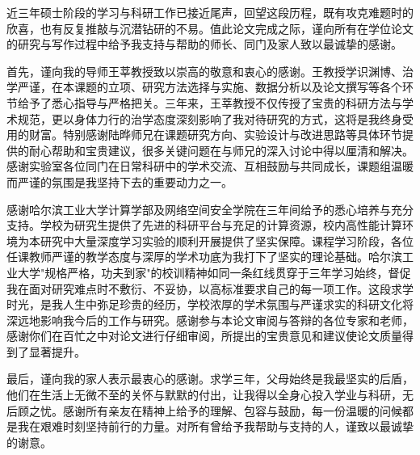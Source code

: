 \begin{acknowledgements}
近三年硕士阶段的学习与科研工作已接近尾声，回望这段历程，既有攻克难题时的欣喜，也有反复推敲与沉潜钻研的不易。值此论文完成之际，谨向所有在学位论文的研究与写作过程中给予我支持与帮助的师长、同门及家人致以最诚挚的感谢。

首先，谨向我的导师王莘教授致以崇高的敬意和衷心的感谢。王教授学识渊博、治学严谨，在本课题的立项、研究方法选择与实施、数据分析以及论文撰写等各个环节给予了悉心指导与严格把关。三年来，王莘教授不仅传授了宝贵的科研方法与学术规范，更以身体力行的治学态度深刻影响了我对待研究的方式，这将是我终身受用的财富。特别感谢陆晔师兄在课题研究方向、实验设计与改进思路等具体环节提供的耐心帮助和宝贵建议，很多关键问题在与师兄的深入讨论中得以厘清和解决。感谢实验室各位同门在日常科研中的学术交流、互相鼓励与共同成长，课题组温暖而严谨的氛围是我坚持下去的重要动力之一。

感谢哈尔滨工业大学计算学部及网络空间安全学院在三年间给予的悉心培养与充分支持。学校为研究生提供了先进的科研平台与充足的计算资源，校内高性能计算环境为本研究中大量深度学习实验的顺利开展提供了坚实保障。课程学习阶段，各位任课教师严谨的教学态度与深厚的学术功底为我打下了坚实的理论基础。哈尔滨工业大学"规格严格，功夫到家"的校训精神如同一条红线贯穿于三年学习始终，督促我在面对研究难点时不敷衍、不妥协，以高标准要求自己的每一项工作。这段求学时光，是我人生中弥足珍贵的经历，学校浓厚的学术氛围与严谨求实的科研文化将深远地影响我今后的工作与研究。感谢参与本论文审阅与答辩的各位专家和老师，感谢你们在百忙之中对论文进行仔细审阅，所提出的宝贵意见和建议使论文质量得到了显著提升。

最后，谨向我的家人表示最衷心的感谢。求学三年，父母始终是我最坚实的后盾，他们在生活上无微不至的关怀与默默的付出，让我得以全身心投入学业与科研，无后顾之忧。感谢所有亲友在精神上给予的理解、包容与鼓励，每一份温暖的问候都是我在艰难时刻坚持前行的力量。对所有曾给予我帮助与支持的人，谨致以最诚挚的谢意。
\end{acknowledgements}